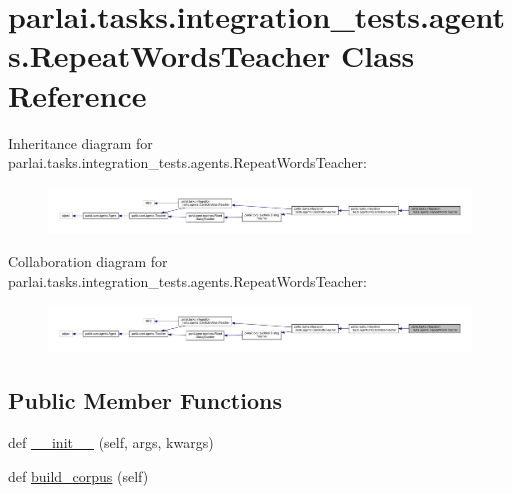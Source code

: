 \hypertarget{classparlai_1_1tasks_1_1integration__tests_1_1agents_1_1RepeatWordsTeacher}{}\section{parlai.\+tasks.\+integration\+\_\+tests.\+agents.\+Repeat\+Words\+Teacher Class Reference}
\label{classparlai_1_1tasks_1_1integration__tests_1_1agents_1_1RepeatWordsTeacher}


Inheritance diagram for parlai.\+tasks.\+integration\+\_\+tests.\+agents.\+Repeat\+Words\+Teacher\+:\nopagebreak
\begin{figure}[H]
\begin{center}
\leavevmode
\includegraphics[width=350pt]{d7/d62/classparlai_1_1tasks_1_1integration__tests_1_1agents_1_1RepeatWordsTeacher__inherit__graph}
\end{center}
\end{figure}


Collaboration diagram for parlai.\+tasks.\+integration\+\_\+tests.\+agents.\+Repeat\+Words\+Teacher\+:\nopagebreak
\begin{figure}[H]
\begin{center}
\leavevmode
\includegraphics[width=350pt]{d4/df9/classparlai_1_1tasks_1_1integration__tests_1_1agents_1_1RepeatWordsTeacher__coll__graph}
\end{center}
\end{figure}
\subsection*{Public Member Functions}
\begin{DoxyCompactItemize}
\item 
def \hyperlink{classparlai_1_1tasks_1_1integration__tests_1_1agents_1_1RepeatWordsTeacher_a169b9a70cebc4aeb54e4b90ddba644ac}{\+\_\+\+\_\+init\+\_\+\+\_\+} (self, args, kwargs)
\item 
def \hyperlink{classparlai_1_1tasks_1_1integration__tests_1_1agents_1_1RepeatWordsTeacher_ad03d8fb602aca6baf0b62f633b3bb54c}{build\+\_\+corpus} (self)
\end{DoxyCompactItemize}
